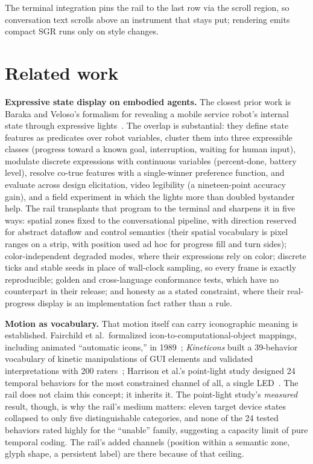\documentclass[11pt]{article}
\begin{document}
The terminal integration pins the rail to the last row via the scroll
region, so conversation text scrolls above an instrument that stays put;
rendering emits compact SGR runs only on style changes.

\section{Related work}
\label{sec:related}

\textbf{Expressive state display on embodied agents.} The closest prior
work is Baraka and Veloso's formalism for revealing a mobile service
robot's internal state through expressive lights~\cite{baraka2018}. The overlap is substantial: they define state
features as predicates over robot variables, cluster them into three
expressible classes (progress toward a known goal, interruption, waiting
for human input), modulate discrete expressions with continuous
variables (percent-done, battery level), resolve co-true features with a
single-winner preference function, and evaluate across design
elicitation, video legibility (a nineteen-point accuracy gain), and a
field experiment in which the lights more than doubled bystander help.
The rail transplants that program to the terminal and sharpens it in
five ways: spatial zones fixed to the conversational pipeline, with
direction reserved for abstract dataflow and control semantics (their
spatial vocabulary is pixel ranges on a strip, with position used ad hoc
for progress fill and turn sides); color-independent degraded modes,
where their expressions rely on color; discrete ticks and stable seeds
in place of wall-clock sampling, so every frame is exactly reproducible;
golden and cross-language conformance tests, which have no counterpart
in their release; and honesty as a stated constraint, where their
real-progress display is an implementation fact rather than a rule.

\textbf{Motion as vocabulary.} That motion itself can carry
iconographic meaning is established. Fairchild et al.\ formalized
icon-to-computational-object mappings, including animated ``automatic
icons,'' in 1989~\cite{fairchild1989}; \emph{Kineticons} built a
39-behavior vocabulary of kinetic manipulations of GUI elements and
validated interpretations with 200 raters~\cite{kineticons}; Harrison
et al.'s point-light study designed 24 temporal behaviors for the most
constrained channel of all, a single LED~\cite{pointlights}. The rail
does not claim this concept; it inherits it. The point-light study's \emph{measured} result, though, is why the rail's medium matters:
eleven target device
states collapsed to only five distinguishable categories, and none of
the 24 tested behaviors rated highly for the ``unable'' family,
suggesting a capacity limit of pure temporal coding. The rail's added channels (position within a semantic zone, glyph shape, a persistent label) are there because of that ceiling.
\end{document}
